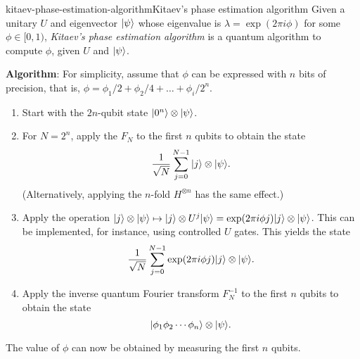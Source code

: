 \begin{topic}{kitaev-phase-estimation-algorithm}{Kitaev's phase estimation algorithm}
    Given a unitary $U$ and eigenvector $|\psi\rangle$ whose eigenvalue is $\lambda = \exp(2 \pi i \phi)$ for some $\phi \in [0, 1)$, \emph{Kitaev's phase estimation algorithm} is a quantum algorithm to compute $\phi$, given $U$ and $|\psi\rangle$.

    \textbf{Algorithm}: For simplicity, assume that $\phi$ can be expressed with $n$ bits of precision, that is, $\phi = \phi_1 / 2 + \phi_2 / 4 + \ldots + \phi_i / 2^n$.
    \begin{enumerate}[label=(\arabic*)]
        \item Start with the $2n$-qubit state $|0^n\rangle \otimes |\psi\rangle$.
        \item For $N = 2^n$, apply the  $F_N$ to the first $n$ qubits to obtain the state
        \[ \frac{1}{\sqrt{N}} \sum_{j = 0}^{N - 1} |j\rangle \otimes |\psi\rangle . \]
        (Alternatively, applying the $n$-fold  $H^{\otimes n}$ has the same effect.)
        \item Apply the operation $|j\rangle \otimes |\psi\rangle \mapsto |j\rangle \otimes U^j |\psi\rangle = \exp(2 \pi i \phi j) |j\rangle \otimes |\psi\rangle$. This can be implemented, for instance, using controlled $U$ gates. This yields the state
        \[ \frac{1}{\sqrt{N}} \sum_{j = 0}^{N - 1} \exp(2 \pi i \phi j) |j\rangle \otimes |\psi\rangle . \]
        \item Apply the inverse quantum Fourier transform $F_N^{-1}$ to the first $n$ qubits to obtain the state
        \[ |\phi_1 \phi_2 \cdots \phi_n\rangle \otimes |\psi\rangle . \]
    \end{enumerate}
    The value of $\phi$ can now be obtained by measuring the first $n$ qubits.
\end{topic}

